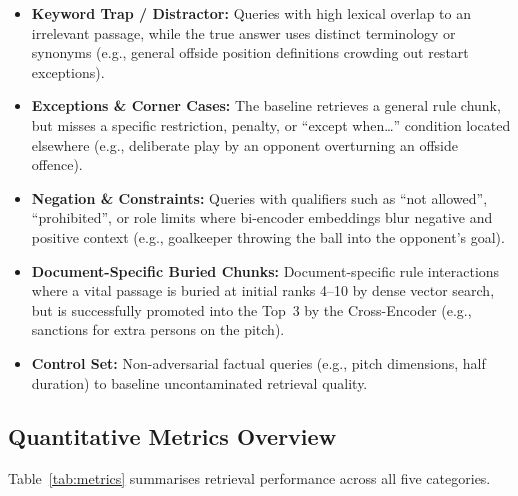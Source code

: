 \documentclass[11pt,a4paper]{article}
\begin{document}
\begin{itemize}[leftmargin=1.5em, itemsep=2pt]
    \item \textbf{Keyword Trap / Distractor:} Queries with high lexical overlap to an irrelevant passage, while the true answer uses distinct terminology or synonyms (e.g., general offside position definitions crowding out restart exceptions).
    \item \textbf{Exceptions \& Corner Cases:} The baseline retrieves a general rule chunk, but misses a specific restriction, penalty, or ``except when\ldots'' condition located elsewhere (e.g., deliberate play by an opponent overturning an offside offence).
    \item \textbf{Negation \& Constraints:} Queries with qualifiers such as ``not allowed'', ``prohibited'', or role limits where bi-encoder embeddings blur negative and positive context (e.g., goalkeeper throwing the ball into the opponent's goal).
    \item \textbf{Document-Specific Buried Chunks:} Document-specific rule interactions where a vital passage is buried at initial ranks 4--10 by dense vector search, but is successfully promoted into the Top~3 by the Cross-Encoder (e.g., sanctions for extra persons on the pitch).
    \item \textbf{Control Set:} Non-adversarial factual queries (e.g., pitch dimensions, half duration) to baseline uncontaminated retrieval quality.
\end{itemize}

\subsection{Quantitative Metrics Overview}

Table~\ref{tab:metrics} summarises retrieval performance across all five categories.

\begin{table}[H]
\centering
\small
\caption{Retrieval metrics by query category (from Cell~9 output).}
\label{tab:metrics}
\end{table}
\end{document}
